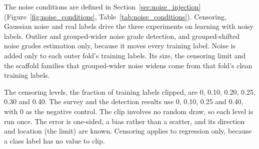 
The noise conditions are defined in Section~\ref{sec:noise_injection} (Figure~\ref{fig:noise_conditions}, Table~\ref{tab:noise_conditions}). Censoring, Gaussian noise and real labels drive the three experiments on learning with noisy labels. Outlier and grouped-wider noise grade detection, and grouped-shifted noise grades estimation only, because it moves every training label. Noise is added only to each outer fold's training labels. Its size, the censoring limit and the scaffold families that grouped-wider noise widens come from that fold's clean training labels.

The censoring levels, the fraction of training labels clipped, are 0, 0.10, 0.20, 0.25, 0.30 and 0.40. The survey and the detection results use 0, 0.10, 0.25 and 0.40, with 0 as the negative control. The clip involves no random draw, so each level is run once. The error is one-sided, a bias rather than a scatter, and its direction and location (the limit) are known. Censoring applies to regression only, because a class label has no value to clip.

